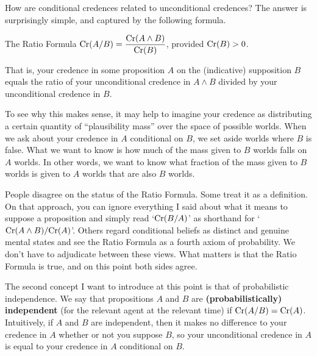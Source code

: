 
How are conditional credences related to unconditional credences?
The answer is surprisingly simple, and captured by the following
formula.
\begin{genericthm}{The Ratio Formula}
  $\text{Cr}(A/B) = \dfrac{\text{Cr}(A \land B)}{\text{Cr}(B)}$, provided $\text{Cr}(B)>0$.
\end{genericthm}
That is, your credence in some proposition $A$ on the (indicative)
supposition $B$ equals the ratio of your unconditional
credence in $A \land B$ divided by your unconditional credence in $B$.

To see why this makes sense, it may help to imagine your credence as
distributing a certain quantity of ``plausibility mass'' over
the space of possible worlds. When we ask about your credence in
$A$ conditional on $B$, we set aside worlds where $B$ is false. What
we want to know is how much of the mass given to $B$ worlds falls on
$A$ worlds. In other words, we want to know what fraction of the mass
given to $B$ worlds is given to $A$ worlds that are also $B$ worlds.

People disagree on the status of the Ratio Formula. Some treat it as a
definition. On that approach, you can ignore everything I said about
what it means to suppose a proposition and simply read `$\text{Cr}(B/A)$' as
shorthand for `$\text{Cr}(A \land B)/\text{Cr}(A)$'. Others regard conditional
beliefs as distinct and genuine mental states and see the Ratio
Formula as a fourth axiom of probability. We
don't have to adjudicate between these views. What matters is that the
Ratio Formula is true, and on this point both sides agree.

The second concept I want to introduce at this point is that of
probabilistic independence. We say that propositions $A$ and $B$ are
\textbf{(probabilistically) independent} (for the relevant agent at
the relevant time) if $\text{Cr}(A/B) = \text{Cr}(A)$. Intuitively, if $A$ and $B$
are independent, then it makes no difference to your credence in $A$
whether or not you suppose $B$, so your unconditional credence in $A$
is equal to your credence in $A$ conditional on $B$.

